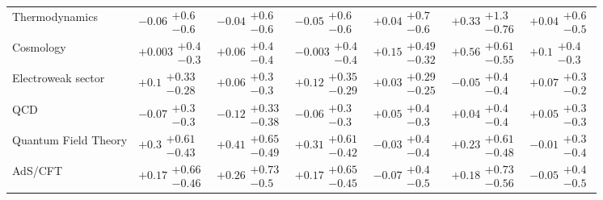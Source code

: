 \begin{table}[H]
\begin{tabular}{lllllll}
Thermodynamics & $-0.06\substack{+0.6 \\ -0.6}$ & $-0.04\substack{+0.6 \\ -0.6}$ & $-0.05\substack{+0.6 \\ -0.6}$ & $+0.04\substack{+0.7 \\ -0.6}$ & $+0.33\substack{+1.3 \\ -0.76}$ & $+0.04\substack{+0.6 \\ -0.5}$ \\
Cosmology & $+0.003\substack{+0.4 \\ -0.3}$ & $+0.06\substack{+0.4 \\ -0.4}$ & $-0.003\substack{+0.4 \\ -0.4}$ & $+0.15\substack{+0.49 \\ -0.32}$ & $\bm{+0.56}\substack{+0.61 \\ -0.55}$ & $+0.1\substack{+0.4 \\ -0.3}$ \\
Electroweak sector & $+0.1\substack{+0.33 \\ -0.28}$ & $+0.06\substack{+0.3 \\ -0.3}$ & $+0.12\substack{+0.35 \\ -0.29}$ & $+0.03\substack{+0.29 \\ -0.25}$ & $-0.05\substack{+0.4 \\ -0.4}$ & $+0.07\substack{+0.3 \\ -0.2}$ \\
QCD & $-0.07\substack{+0.3 \\ -0.3}$ & $-0.12\substack{+0.33 \\ -0.38}$ & $-0.06\substack{+0.3 \\ -0.3}$ & $+0.05\substack{+0.4 \\ -0.3}$ & $+0.04\substack{+0.4 \\ -0.4}$ & $+0.05\substack{+0.3 \\ -0.3}$ \\
Quantum Field Theory & $+0.3\substack{+0.61 \\ -0.43}$ & $+0.41\substack{+0.65 \\ -0.49}$ & $+0.31\substack{+0.61 \\ -0.42}$ & $-0.03\substack{+0.4 \\ -0.4}$ & $+0.23\substack{+0.61 \\ -0.48}$ & $-0.01\substack{+0.3 \\ -0.4}$ \\
AdS/CFT & $+0.17\substack{+0.66 \\ -0.46}$ & $+0.26\substack{+0.73 \\ -0.5}$ & $+0.17\substack{+0.65 \\ -0.45}$ & $-0.07\substack{+0.4 \\ -0.5}$ & $+0.18\substack{+0.73 \\ -0.56}$ & $-0.05\substack{+0.4 \\ -0.5}$ \\
\bottomrule
\end{tabular}\normalsize\renewcommand{\arraystretch}{1}
\end{table}
